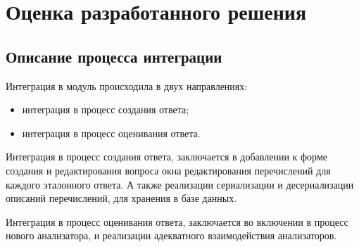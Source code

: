 \documentclass[a4paper,english,russian]{G2-105}
\begin{document}
\chapter{Оценка разработанного решения}
\ttl
\section{Описание процесса интеграции}
\par Интеграция в модуль происходила в двух направлениях:
\begin{itemize}
    \item интеграция в процесс создания ответа;
    \item интеграция в процесс оценивания ответа.
\end{itemize}
\par Интеграция в процесс создания ответа, заключается в добавлении к форме создания и редактирования вопроса окна редактирования перечислений для каждого эталонного ответа.
А также реализации сериализации и десериализации описаний перечислений, для хранения в базе данных.
\par Интеграция в процесс оценивания ответа, заключается во включении в процесс нового анализатора, и реализации адекватного взаимодействия анализаторов.
\end{document}

